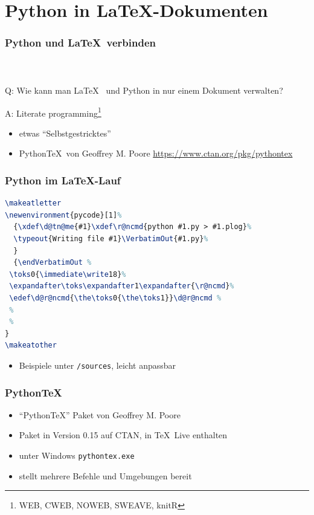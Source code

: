 \documentclass[12pt,ngerman]{beamer}
\begin{document}
\section{Python in \LaTeX-Dokumenten}

\begin{frame}
\frametitle{Python und \LaTeX\ verbinden}
\framesubtitle{~}

Q: Wie kann man \LaTeX~ und Python in nur einem Dokument verwalten?

A: Literate programming\footnote{WEB, CWEB, NOWEB, SWEAVE, knitR}

\begin{itemize}
\item etwas \enquote{Selbstgestricktes}
\item Python\TeX\ von Ge­of­frey M. Poore \url{https://www.ctan.org/pkg/pythontex}
\end{itemize}
\end{frame}

\begin{frame}[fragile]
\frametitle{Python im \LaTeX-Lauf}

\begin{lstlisting}[basicstyle={\ttfamily\footnotesize},language={TeX},morekeywords={makeatletter,endVerbatimOut,typeout,lstinputlisting,makeatother,VerbatimOut,footnotesize}]
\makeatletter
\newenvironment{pycode}[1]%
  {\xdef\d@tn@me{#1}\xdef\r@ncmd{python #1.py > #1.plog}%
  \typeout{Writing file #1}\VerbatimOut{#1.py}% 
  }
  {\endVerbatimOut %
 \toks0{\immediate\write18}%
 \expandafter\toks\expandafter1\expandafter{\r@ncmd}%
 \edef\d@r@ncmd{\the\toks0{\the\toks1}}\d@r@ncmd %
 %
 %
}
\makeatother
\end{lstlisting}

\begin{itemize}
	\item Beispiele unter \texttt{/sources}, leicht anpassbar
\end{itemize}

\end{frame}

\begin{frame}
\frametitle{Python\TeX}

\begin{itemize}
\item \enquote{PythonTeX} Paket von Ge­of­frey M. Poore
\item Paket in Version 0.15 auf CTAN, in \TeX~Live enthalten
\item unter Windows \texttt{pythontex.exe}
\item stellt mehrere Befehle und Umgebungen bereit
\end{itemize}
\end{frame}
\end{document}
